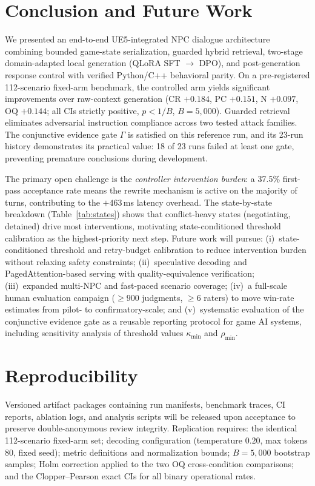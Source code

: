 \documentclass[conference]{IEEEtran}
\begin{document}
\section{Conclusion and Future Work}

We presented an end-to-end UE5-integrated NPC dialogue architecture
combining bounded game-state serialization, guarded hybrid retrieval,
two-stage domain-adapted local generation (QLoRA SFT $\to$ DPO),
and post-generation response control with verified Python/C++
behavioral parity. On a pre-registered 112-scenario fixed-arm
benchmark, the controlled arm yields significant improvements over
raw-context generation (CR $+0.184$, PC $+0.151$, N $+0.097$,
OQ $+0.144$; all CIs strictly positive, $p{<}1/B$, $B{=}5{,}000$).
Guarded retrieval eliminates adversarial instruction compliance
across two tested attack families. The conjunctive evidence gate
$\Gamma$ is satisfied on this reference run, and its 23-run
history demonstrates its practical value: 18 of 23 runs failed at
least one gate, preventing premature conclusions during development.

The primary open challenge is the \textit{controller intervention
burden}: a 37.5\% first-pass acceptance rate means the rewrite
mechanism is active on the majority of turns, contributing to
the $+463$\,ms latency overhead. The state-by-state breakdown
(Table~\ref{tab:states}) shows that conflict-heavy states
(negotiating, detained) drive most interventions, motivating
state-conditioned threshold calibration as the highest-priority
next step. Future work will pursue:
(i)~state-conditioned threshold and retry-budget calibration
to reduce intervention burden without relaxing safety
constraints;
(ii)~speculative decoding \cite{Leviathan2022SpecDec} and
PagedAttention-based serving \cite{Kwon2023vLLM} with
quality-equivalence verification;
(iii)~expanded multi-NPC and fast-paced scenario coverage;
(iv)~a full-scale human evaluation campaign
($\ge\!900$ judgments, $\ge\!6$ raters) to move win-rate
estimates from pilot- to confirmatory-scale; and
(v)~systematic evaluation of the conjunctive evidence gate
as a reusable reporting protocol for game AI systems,
including sensitivity analysis of threshold values $\kappa_{\min}$
and $\rho_{\min}$.

\section*{Reproducibility}
Versioned artifact packages containing run manifests, benchmark
traces, CI reports, ablation logs, and analysis scripts will be
released upon acceptance to preserve double-anonymous review
integrity. Replication requires: the identical 112-scenario
fixed-arm set; decoding configuration (temperature $0.20$,
max tokens $80$, fixed seed); metric definitions and
normalization bounds; $B{=}5{,}000$ bootstrap samples;
Holm correction applied to the two OQ cross-condition
comparisons; and the Clopper--Pearson exact CIs for all binary
operational rates.
\end{document}

